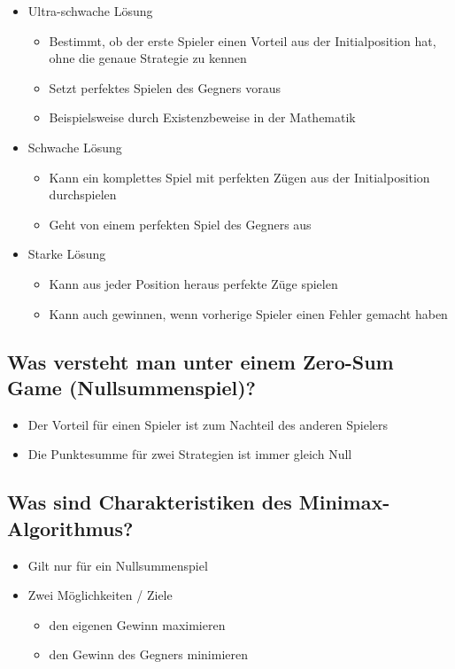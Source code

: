 \documentclass[a4paper]{article}
\begin{document}
		\begin{itemize}
			\item Ultra-schwache Lösung
			\begin{itemize}
				\item Bestimmt, ob der erste Spieler einen Vorteil aus der Initialposition hat, ohne die genaue Strategie zu kennen
				\item Setzt perfektes Spielen des Gegners voraus
				\item Beispielsweise durch Existenzbeweise in der Mathematik
			\end{itemize}
			\item Schwache Lösung
			\begin{itemize}
				\item Kann ein komplettes Spiel mit perfekten Zügen aus der Initialposition durchspielen
				\item Geht von einem perfekten Spiel des Gegners aus
			\end{itemize}
			\item Starke Lösung
			\begin{itemize}
				\item Kann aus jeder Position heraus perfekte Züge spielen
				\item Kann auch gewinnen, wenn vorherige Spieler einen Fehler gemacht haben
			\end{itemize}
		\end{itemize}
		
		\subsection{Was versteht man unter einem Zero-Sum Game (Nullsummenspiel)?}
		
		\begin{itemize}
			\item Der Vorteil für einen Spieler ist zum Nachteil des anderen Spielers
			\item Die Punktesumme für zwei Strategien ist immer gleich Null
		\end{itemize}
	
		\subsection{Was sind Charakteristiken des Minimax-Algorithmus?}
		
		\begin{itemize}
			\item Gilt nur für ein Nullsummenspiel
			\item Zwei Möglichkeiten / Ziele
				\begin{itemize}
					\item den eigenen Gewinn maximieren
					\item den Gewinn des Gegners minimieren
				\end{itemize}
		\end{itemize}
	
\end{document}
